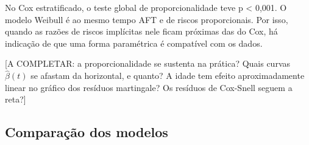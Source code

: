 \documentclass[
  brazilian,
]{article}
\begin{document}
No Cox estratificado, o teste global de proporcionalidade teve p
\textless{} 0,001. O modelo Weibull é ao mesmo tempo AFT e de riscos
proporcionais. Por isso, quando as razões de riscos implícitas nele
ficam próximas das do Cox, há indicação de que uma forma paramétrica é
compatível com os dados.

{[}A COMPLETAR: a proporcionalidade se sustenta na prática? Quais curvas
\(\hat\beta(t)\) se afastam da horizontal, e quanto? A idade tem efeito
aproximadamente linear no gráfico dos resíduos martingale? Os resíduos
de Cox-Snell seguem a reta?{]}

\subsection{Comparação dos modelos}\label{comparauxe7uxe3o-dos-modelos}
\end{document}
